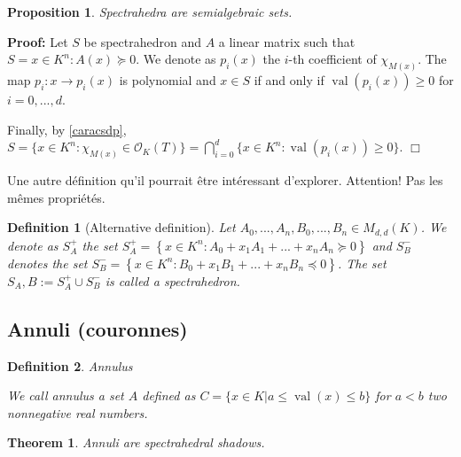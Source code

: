 \documentclass[a4paper,12pt]{article}
\newenvironment{proof}{\hbox{}\vspace{-0.8cm} {\bf Proof:}}{\hfill $\Box$}
\newtheorem{theorem}{Theorem}[section]
\newtheorem{proposition}{Proposition}
\newtheorem{definition}{Definition}
\newcommand{\corentin}[1]{{\color{red} #1}} %
\DeclareMathOperator{\val}{val}
\newcommand{\OK}{\mathcal{O}_K}
\begin{document}
\begin{proposition}
  Spectrahedra are semialgebraic sets. 
\end{proposition}

\begin{proof}
  Let $S$ be spectrahedron and $A$ a linear matrix such that $S={x \in K^n : A(x) \succeq 0}$. 
  We denote as $p_i(x)$ the $i$-th coefficient of $\chi_{M(x)}$. The map $p_i	: x \to p_i(x)$ is polynomial and $x \in S$ if and only if $\val(p_i(x)) \geq 0$ for $i=0,...,d$.
  
  Finally, by \ref{caracsdp}, $S = \{x \in K^n : \chi_{M(x)} \in \OK(T)\} = \bigcap\limits_{i=0}^d \{x \in K^n : \val(p_i(x)) \geq 0\}$.
\end{proof}

\corentin{ Une autre définition qu'il pourrait être intéressant d'explorer. Attention! Pas les mêmes propriétés.}
\begin{definition}[Alternative definition]
  Let $A_0, ..., A_n, B_0, ..., B_n \in M_{d,d}(K)$. 
  We denote as $S^+_A$ the set $S_{A}^+ = \left\{ x \in K^n : A_0 + x_1 A_1+ ...+x_nA_n \succeq 0  \right\}$ and $S^-_B$ denotes the set $S^-_B = \left\{ x \in K^n : B_0 + x_1 B_1+ ...+x_nB_n \preceq 0\right\}$. 
  The set $S_A,B := S_A^+ \cup S_B^-$ is called a \emph{spectrahedron}.
\end{definition}

\subsection{Annuli (couronnes)}
\begin{definition}
	Annulus
	
	We call \emph{annulus} a set $A$ defined as $C = \{x \in K  | a\le \val(x) \le b\} $ for $a < b$ two nonnegative real numbers.
\end{definition}

\begin{theorem}
Annuli are spectrahedral shadows.
\end{theorem} 
\end{document}
